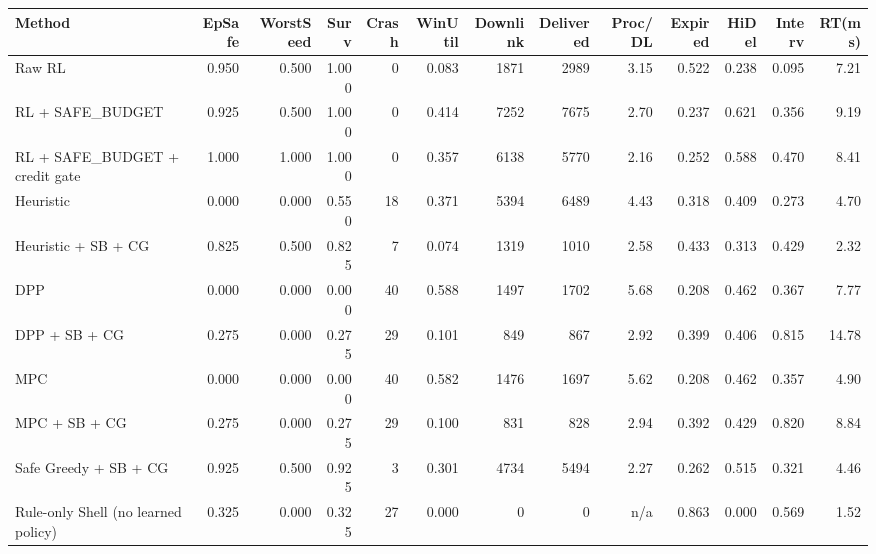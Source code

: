 \begin{tabular}{lrrrrrrrrrrrr}
\hline
Method & EpSafe & WorstSeed & Surv & Crash & WinUtil & Downlink & Delivered & Proc/DL & Expired & HiDel & Interv & RT(ms) \\
\hline
Raw RL & 0.950 & 0.500 & 1.000 & 0 & 0.083 & 1871 & 2989 & 3.15 & 0.522 & 0.238 & 0.095 & 7.21 \\
RL + SAFE\_BUDGET & 0.925 & 0.500 & 1.000 & 0 & 0.414 & 7252 & 7675 & 2.70 & 0.237 & 0.621 & 0.356 & 9.19 \\
RL + SAFE\_BUDGET + credit gate & 1.000 & 1.000 & 1.000 & 0 & 0.357 & 6138 & 5770 & 2.16 & 0.252 & 0.588 & 0.470 & 8.41 \\
Heuristic & 0.000 & 0.000 & 0.550 & 18 & 0.371 & 5394 & 6489 & 4.43 & 0.318 & 0.409 & 0.273 & 4.70 \\
Heuristic + SB + CG & 0.825 & 0.500 & 0.825 & 7 & 0.074 & 1319 & 1010 & 2.58 & 0.433 & 0.313 & 0.429 & 2.32 \\
DPP & 0.000 & 0.000 & 0.000 & 40 & 0.588 & 1497 & 1702 & 5.68 & 0.208 & 0.462 & 0.367 & 7.77 \\
DPP + SB + CG & 0.275 & 0.000 & 0.275 & 29 & 0.101 & 849 & 867 & 2.92 & 0.399 & 0.406 & 0.815 & 14.78 \\
MPC & 0.000 & 0.000 & 0.000 & 40 & 0.582 & 1476 & 1697 & 5.62 & 0.208 & 0.462 & 0.357 & 4.90 \\
MPC + SB + CG & 0.275 & 0.000 & 0.275 & 29 & 0.100 & 831 & 828 & 2.94 & 0.392 & 0.429 & 0.820 & 8.84 \\
Safe Greedy + SB + CG & 0.925 & 0.500 & 0.925 & 3 & 0.301 & 4734 & 5494 & 2.27 & 0.262 & 0.515 & 0.321 & 4.46 \\
Rule-only Shell (no learned policy) & 0.325 & 0.000 & 0.325 & 27 & 0.000 & 0 & 0 & n/a & 0.863 & 0.000 & 0.569 & 1.52 \\
\hline
\end{tabular}
